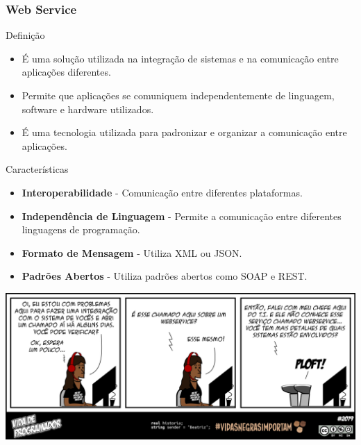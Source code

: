 \documentclass[
	9pt, %
	t, %
]{beamer}
\begin{document}
\begin{frame}
	\frametitle{Web Service}

	\begin{block}{Definição}
		\begin{itemize}
			\item É uma solução utilizada na integração de sistemas e na comunicação entre aplicações diferentes.
			\item Permite que aplicações se comuniquem independentemente de linguagem, software e hardware utilizados.
			\item É uma tecnologia utilizada para \alert{padronizar} e \alert{organizar} a comunicação entre aplicações.
		\end{itemize}
	\end{block}

	\begin{block}{Características}
		\begin{itemize}
			\item \textbf{Interoperabilidade} - Comunicação entre diferentes plataformas.
			\item \textbf{Independência de Linguagem} - Permite a comunicação entre diferentes linguagens de programação.
			\item \textbf{Formato de Mensagem} - Utiliza XML ou JSON.
			\item \textbf{Padrões Abertos} - Utiliza padrões abertos como SOAP e REST.
		\end{itemize}
	\end{block}

\end{frame}

\begin{frame}[plain, c]
	\centering
	\includegraphics[width=0.9\linewidth]{vdp_ws.png}
\end{frame}
\end{document}
